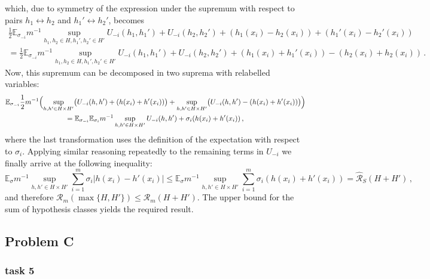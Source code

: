 \documentclass[a4paper]{article}
\newcommand{\ex}{\mathbb{E}}
\begin{document}
which, due to symmetry of the expression under the supremum with respect to pairs
$h_1 \leftrightarrow h_2$ and $h_1' \leftrightarrow h_2'$, becomes
\begin{multline*}
  \frac{1}{2} \ex_{\sigma_{-i}} m^{-1}
      \sup_{h_1, h_2\in H, h_1', h_2'\in H'}
        U_{-i}(h_1,h_1') + U_{-i}(h_2,h_2')
        + (h_1(x_i) - h_2(x_i)) + (h_1'(x_i) - h_2'(x_i)) \\
  = \frac{1}{2} \ex_{\sigma_{-i}} m^{-1}
      \sup_{h_1, h_2\in H, h_1', h_2'\in H'}
        U_{-i}(h_1,h_1') + U_{-i}(h_2,h_2')
        + (h_1(x_i) + h_1'(x_i)) - (h_2(x_i) + h_2(x_i)) \,.
\end{multline*}
Now, this supremum can be decomposed in two suprema with relabelled variables:
\begin{multline*}
  \ex_{\sigma_{-i}} \frac{1}{2} m^{-1} \Bigl(
      \sup_{h, h'\in H\times H'} \bigl(U_{-i}(h,h') + (h(x_i) + h'(x_i))\bigr)
      + \sup_{h, h'\in H\times H'} \bigl(U_{-i}(h,h') - (h(x_i) + h'(x_i))\bigr)
    \Bigr) \\
    = \ex_{\sigma_{-i}} \ex_{\sigma_i} m^{-1}
      \sup_{h, h'\in H\times H'} U_{-i}(h,h') + \sigma_i (h(x_i) + h'(x_i)) \,,
\end{multline*}
where the last transformation uses the definition of the expectation with respect
to $\sigma_i$. Applying similar reasoning repeatedly to the remaining terms in $U_{-i}$
we finally arrive at the following inequality:
\begin{equation*}
  \ex_\sigma m^{-1} \sup_{h, h'\in H\times H'} \sum_{i=1}^m \sigma_i |h(x_i) - h'(x_i)|
    \leq \ex_\sigma m^{-1} \sup_{h, h'\in H\times H'} \sum_{i=1}^m \sigma_i (h(x_i) + h'(x_i))
    = \hat{\mathcal{R}}_S(H+H')
    \,,
\end{equation*}
and therefore $\mathcal{R}_m(\max\{H,H'\}) \leq \mathcal{R}_m(H+H')$. The upper bound
for the sum of hypothesis classes yields the required result.




\subsection{Problem C} %
\label{sub:problem_2c}

\subsubsection{task 5} %
\label{ssub:task_2c5}
\end{document}
